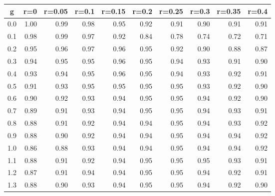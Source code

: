%
\begin{table}[!tbp]
 \begin{center}
 \begin{tabular}{rrrrrrrrrr}\hline\hline
\multicolumn{1}{c}{g}&\multicolumn{1}{c}{r=0}&\multicolumn{1}{c}{r=0.05}&\multicolumn{1}{c}{r=0.1}&\multicolumn{1}{c}{r=0.15}&\multicolumn{1}{c}{r=0.2}&\multicolumn{1}{c}{r=0.25}&\multicolumn{1}{c}{r=0.3}&\multicolumn{1}{c}{r=0.35}&\multicolumn{1}{c}{r=0.4}\tabularnewline
\hline
0.0&1.00&0.99&0.98&0.95&0.92&0.91&0.90&0.91&0.91\tabularnewline
0.1&0.98&0.99&0.97&0.92&0.84&0.78&0.74&0.72&0.71\tabularnewline
0.2&0.95&0.96&0.97&0.96&0.95&0.92&0.90&0.88&0.87\tabularnewline
0.3&0.94&0.95&0.95&0.96&0.95&0.94&0.93&0.91&0.90\tabularnewline
0.4&0.93&0.94&0.95&0.96&0.95&0.94&0.93&0.92&0.91\tabularnewline
0.5&0.91&0.93&0.95&0.95&0.95&0.95&0.93&0.92&0.90\tabularnewline
0.6&0.90&0.92&0.93&0.94&0.95&0.95&0.94&0.92&0.90\tabularnewline
0.7&0.89&0.91&0.93&0.94&0.95&0.95&0.94&0.93&0.91\tabularnewline
0.8&0.88&0.91&0.92&0.94&0.94&0.95&0.94&0.93&0.92\tabularnewline
0.9&0.88&0.90&0.92&0.94&0.94&0.95&0.94&0.94&0.92\tabularnewline
1.0&0.86&0.88&0.93&0.94&0.94&0.95&0.94&0.94&0.92\tabularnewline
1.1&0.88&0.91&0.92&0.94&0.95&0.95&0.95&0.93&0.91\tabularnewline
1.2&0.87&0.91&0.94&0.94&0.95&0.95&0.94&0.92&0.91\tabularnewline
1.3&0.88&0.90&0.93&0.94&0.95&0.95&0.94&0.92&0.90\tabularnewline
\hline
\end{tabular}

\end{center}

\end{table}

